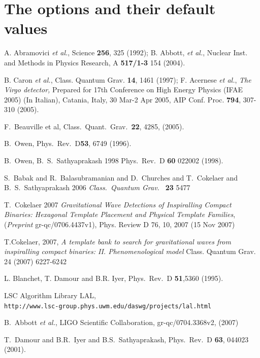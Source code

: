 \documentclass[a4paper,10pt]{article}
\begin{document}
\section{The options and their default values}




\begin{thebibliography}{99}
A. Abramovici {\it et al.}, Science {\bf 256}, 325 (1992);
B. Abbott, {\it et al.}, Nuclear Inst. and Methods in Physics 
Research, A {\bf 517/1-3} 154 (2004).

B. Caron {\it et al.}, Class. Quantum Grav. {\bf 14}, 1461 (1997);
F. Acernese {\it et al.}, {\em The Virgo detector,} 
Prepared for 17th Conference on High Energy Physics (IFAE 2005) (In Italian), 
Catania, Italy, 30 Mar-2 Apr 2005,  AIP Conf. Proc. {\bf 794}, 307-310 (2005).

F.~Beauville et al, Class.\ Quant.\ Grav.\ \textbf{22}, 4285, (2005).

B.~Owen, Phys.\ Rev.\  D\textbf {53}, 6749 (1996).

 B.~Owen, B.~S.~Sathyaprakash 1998 Phys.\ Rev.\ 
D \textbf{60} 022002 (1998).

S.~Babak and R.~Balasubramanian and D.~Churches and T.~Cokelaer and B.~S.~Sathyaprakash 2006 \textit{Class.\ Quantum Grav.\ }
\textbf{23} 5477

 T.~Cokelaer 2007 \textit{Gravitational Wave Detections of Inspiralling Compact Binaries: Hexagonal Template Placement and Physical Template Families}, (\textit{Preprint} gr-qc/0706.4437v1), Phys. Review D 76, 10, 2007 (15 Nov 2007) 


 T.Cokelaer, 2007, \textit{A template bank to search for gravitational waves from inspiralling compact binaries: II. Phenomenological model}
Class. Quantum Grav. 24 (2007) 6227-6242 


 L. Blanchet, T. Damour and B.R. Iyer, Phys.\ Rev.\ D {\bf 51},5360 (1995).

 LSC Algorithm Library LAL,\\
{\tt http://www.lsc-group.phys.uwm.edu/daswg/\-projects/lal.html}

B.~Abbott {\it et al.}, LIGO Scientific Collaboration, gr-qc/0704.3368v2,
(2007)

T.~Damour and B.R.~Iyer and B.S.~Sathyaprakash, Phys.\ Rev.\ D
\textbf{63}, 044023 (2001).

\end{thebibliography}


\label{theend}
\end{document}

